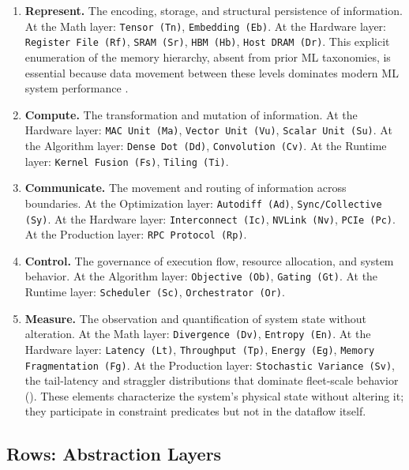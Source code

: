 \documentclass[10pt,twocolumn]{article}
\begin{document}
\begin{enumerate}[nosep, leftmargin=*]
\item \textbf{Represent.} The encoding, storage, and structural persistence of information. At the Math layer: \texttt{Tensor (Tn)}, \texttt{Embedding (Eb)}. At the Hardware layer: \texttt{Register File (Rf)}, \texttt{SRAM (Sr)}, \texttt{HBM (Hb)}, \texttt{Host DRAM (Dr)}. This explicit enumeration of the  memory hierarchy, absent from prior ML taxonomies, is essential because data movement between these levels dominates modern ML system performance \citep{jouppi2017, ivanov2021data}.

\item \textbf{Compute.} The transformation and mutation of information. At the Hardware layer: \texttt{MAC Unit (Ma)}, \texttt{Vector Unit (Vu)}, \texttt{Scalar Unit (Su)}. At the Algorithm layer: \texttt{Dense Dot (Dd)}, \texttt{Convolution (Cv)}. At the Runtime layer: \texttt{Kernel Fusion (Fs)}, \texttt{Tiling (Ti)}.

\item \textbf{Communicate.} The movement and routing of information across boundaries. At the Optimization layer: \texttt{Autodiff (Ad)}, \texttt{Sync/Collective (Sy)}. At the Hardware layer: \texttt{Interconnect (Ic)}, \texttt{NVLink (Nv)}, \texttt{PCIe (Pc)}. At the Production layer: \texttt{RPC Protocol (Rp)}.

\item \textbf{Control.} The governance of execution flow, resource allocation, and system behavior. At the Algorithm layer: \texttt{Objective (Ob)}, \texttt{Gating (Gt)}. At the Runtime layer: \texttt{Scheduler (Sc)}, \texttt{Orchestrator (Or)}.

\item \textbf{Measure.} The observation and quantification of system state without alteration. At the Math layer: \texttt{Divergence (Dv)}, \texttt{Entropy (En)}. At the Hardware layer: \texttt{Latency (Lt)}, \texttt{Throughput (Tp)}, \texttt{Energy (Eg)}, \texttt{Memory Fragmentation (Fg)}. At the Production layer: \texttt{Stochastic Variance (Sv)}, the tail-latency and straggler distributions that dominate fleet-scale behavior (). These elements characterize the system's physical state without altering it; they participate in constraint predicates but not in the dataflow itself.
\end{enumerate}

\subsection{Rows: Abstraction Layers}
\end{document}
